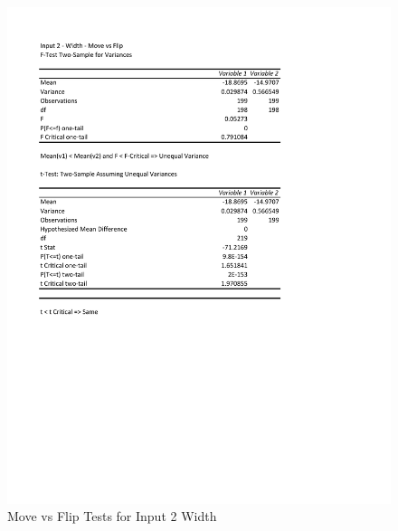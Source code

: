 \documentclass[times]{article}
\begin{document}
	\begin{figure}
		\caption{Move vs Flip Tests for Input 2 Width}
		\label{fig:2mutation_moea}
		\includegraphics[width=\textwidth]{./t_test/2_mutation_moea.pdf}
	\end{figure}
\end{document}
